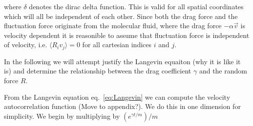 where $\delta$ denotes the dirac delta function. This is valid for all spatial
coordinates which will all be independent of each other. Since both the drag
force and the fluctuation force originate from the molecular fluid, where the
drag force $-\alpha \vec{v}$ is velocity dependent it is reasonible to assume
that fluctuation force is independent of velocity, i.e. $\langle R_i v_j \rangle
= 0$ for all cartesian indices $i$ and $j$.



In the following we will attempt justify the Langevin equaiton (why it is like
it is) and determine the relationship between the drag coefficient $\gamma$ and
the random force $R$.


From the Langevin equation eq.~\eqref{eq:Langevin} we can compute the velocity
autocorrelation function (Move to appendix?). We do this in one dimension for
simplicity. We begin by multiplying by $(e^{\gamma t /m})/m$

